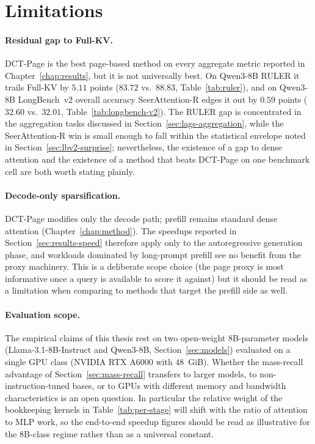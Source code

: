 \section{Limitations}\label{sec:limitations}

\paragraph{Residual gap to Full-KV.}
DCT-Page is the best page-based method on every aggregate metric
reported in Chapter~\ref{chap:results}, but it is not universally
best.  On Qwen3-8B RULER it trails Full-KV by $5.11$ points
($83.72$ vs.\ $88.83$, Table~\ref{tab:ruler}), and on Qwen3-8B
LongBench~v2 overall accuracy SeerAttention-R edges it out by $0.59$
points ($32.60$ vs.\ $32.01$, Table~\ref{tab:longbench-v2}).  The
RULER gap is concentrated in the aggregation tasks discussed in
Section~\ref{sec:lags-aggregation}, while the SeerAttention-R win is
small enough to fall within the statistical envelope noted in
Section~\ref{sec:lbv2-surprise}; nevertheless, the existence of a gap
to dense attention and the existence of a method that beats DCT-Page
on one benchmark cell are both worth stating plainly.

\paragraph{Decode-only sparsification.}
DCT-Page modifies only the decode path; prefill remains standard
dense attention (Chapter~\ref{chap:method}).  The speedups reported in
Section~\ref{sec:results-speed} therefore apply only to the
autoregressive generation phase, and workloads dominated by
long-prompt prefill see no benefit from the proxy machinery.  This is a deliberate scope choice (the page
proxy is most informative once a query is available to score it
against) but it should be read as a limitation when comparing to
methods that target the prefill side as well.

\paragraph{Evaluation scope.}
The empirical claims of this thesis rest on two open-weight
8B-parameter models (Llama-3.1-8B-Instruct and Qwen3-8B,
Section~\ref{sec:models}) evaluated on a single GPU class (NVIDIA RTX
A6000 with $48$~GiB).  Whether the mass-recall advantage of
Section~\ref{sec:mass-recall} transfers to larger models, to
non-instruction-tuned bases, or to GPUs with different memory and
bandwidth characteristics is an open question.  In particular the
relative weight of the bookkeeping kernels in Table~\ref{tab:per-stage}
will shift with the ratio of attention to MLP work, so the end-to-end
speedup figures should be read as illustrative for the 8B-class regime
rather than as a universal constant.

